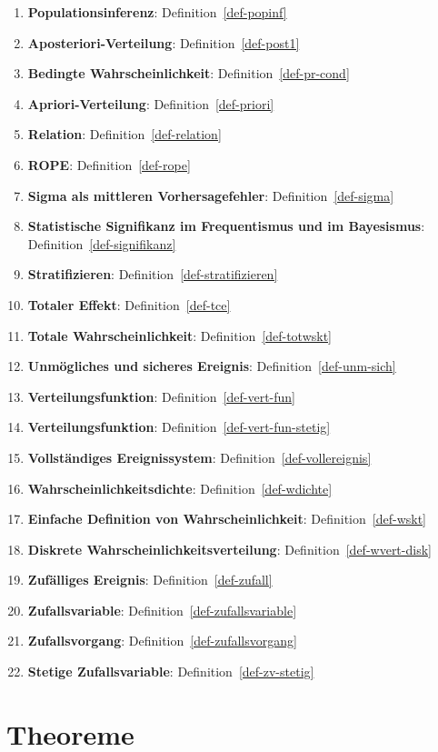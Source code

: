 \documentclass[
  ngerman,
  letterpaper,
  twoside,
  open=any]{scrbook}
\theoremstyle{definition}
\theoremstyle{plain}
\theoremstyle{definition}
\theoremstyle{definition}
\theoremstyle{definition}
\theoremstyle{definition}
\theoremstyle{remark}
\begin{document}
\begin{enumerate}
\item
  \textbf{Populationsinferenz}: Definition~\ref{def-popinf}
\item
  \textbf{Aposteriori-Verteilung}: Definition~\ref{def-post1}
\item
  \textbf{Bedingte Wahrscheinlichkeit}: Definition~\ref{def-pr-cond}
\item
  \textbf{Apriori-Verteilung}: Definition~\ref{def-priori}
\item
  \textbf{Relation}: Definition~\ref{def-relation}
\item
  \textbf{ROPE}: Definition~\ref{def-rope}
\item
  \textbf{Sigma als mittleren Vorhersagefehler}:
  Definition~\ref{def-sigma}
\item
  \textbf{Statistische Signifikanz im Frequentismus und im Bayesismus}:
  Definition~\ref{def-signifikanz}
\item
  \textbf{Stratifizieren}: Definition~\ref{def-stratifizieren}
\item
  \textbf{Totaler Effekt}: Definition~\ref{def-tce}
\item
  \textbf{Totale Wahrscheinlichkeit}: Definition~\ref{def-totwskt}
\item
  \textbf{Unmögliches und sicheres Ereignis}:
  Definition~\ref{def-unm-sich}
\item
  \textbf{Verteilungsfunktion}: Definition~\ref{def-vert-fun}
\item
  \textbf{Verteilungsfunktion}: Definition~\ref{def-vert-fun-stetig}
\item
  \textbf{Vollständiges Ereignissystem}:
  Definition~\ref{def-vollereignis}
\item
  \textbf{Wahrscheinlichkeitsdichte}: Definition~\ref{def-wdichte}
\item
  \textbf{Einfache Definition von Wahrscheinlichkeit}:
  Definition~\ref{def-wskt}
\item
  \textbf{Diskrete Wahrscheinlichkeitsverteilung}:
  Definition~\ref{def-wvert-disk}
\item
  \textbf{Zufälliges Ereignis}: Definition~\ref{def-zufall}
\item
  \textbf{Zufallsvariable}: Definition~\ref{def-zufallsvariable}
\item
  \textbf{Zufallsvorgang}: Definition~\ref{def-zufallsvorgang}
\item
  \textbf{Stetige Zufallsvariable}: Definition~\ref{def-zv-stetig}
\end{enumerate}

\chapter{Theoreme}\label{theoreme}
\end{document}
